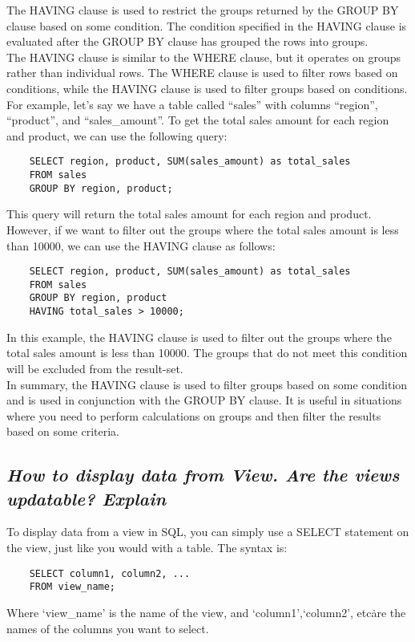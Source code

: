 \documentclass{article}
\begin{document}
The HAVING clause is used to restrict the groups returned by the GROUP BY clause based on some condition. The condition specified in the HAVING clause is evaluated after the GROUP BY clause has grouped the rows into groups.\\

The HAVING clause is similar to the WHERE clause, but it operates on groups rather than individual rows. The WHERE clause is used to filter rows based on conditions, while the HAVING clause is used to filter groups based on conditions.\\

For example, let's say we have a table called ``sales'' with columns ``region'', ``product'', and ``sales\_amount''. To get the total sales amount for each region and product, we can use the following query:
\begin{lstlisting}
    SELECT region, product, SUM(sales_amount) as total_sales
    FROM sales
    GROUP BY region, product;
\end{lstlisting}
This query will return the total sales amount for each region and product. However, if we want to filter out the groups where the total sales amount is less than 10000, we can use the HAVING clause as follows:
\begin{lstlisting}
    SELECT region, product, SUM(sales_amount) as total_sales
    FROM sales
    GROUP BY region, product
    HAVING total_sales > 10000;
\end{lstlisting}
In this example, the HAVING clause is used to filter out the groups where the total sales amount is less than 10000. The groups that do not meet this condition will be excluded from the result-set.\\

In summary, the HAVING clause is used to filter groups based on some condition and is used in conjunction with the GROUP BY clause. It is useful in situations where you need to perform calculations on groups and then filter the results based on some criteria.
\subsection{\textit{How to display data from View. Are the views updatable? Explain}}
To display data from a view in SQL, you can simply use a SELECT statement on the view, just like you would with a table. The syntax is:
\begin{lstlisting}
    SELECT column1, column2, ...
    FROM view_name;
\end{lstlisting}
Where `view\_name' is the name of the view, and `column1',`column2', etc\. are the names of the columns you want to select.
\end{document}
